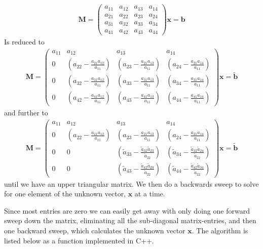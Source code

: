 \begin{align}
  \mathbf{M} = 
 \left( \begin{array}{rrrr}
 a_{11} & a_{12} & a_{13} & a_{14} \\
 a_{21} & a_{22} & a_{23} & a_{24} \\
 a_{31} & a_{32} & a_{33} & a_{34} \\
 a_{41} & a_{42} & a_{43} & a_{44}
 \end{array} \right)\mathbf{x} = \mathbf{b}
\end{align}
Is reduced to
\begin{align}
  \mathbf{M} = 
 \left( \begin{array}{rrrr}
 a_{11} & a_{12} & a_{13} & a_{14} \\
 0 & (a_{22}-\frac{a_{21}a_{12}}{a_{11}}) & (a_{23}-\frac{a_{21}a_{13}}{a_{11}}) & (a_{24}-\frac{a_{21}a_{14}}{a_{11}}) \\
 0 & (a_{32}-\frac{a_{31}a_{12}}{a_{11}}) & (a_{33}-\frac{a_{31}a_{13}}{a_{11}}) & (a_{34}-\frac{a_{31}a_{14}}{a_{11}}) \\
 0 & (a_{42}-\frac{a_{41}a_{12}}{a_{11}}) & (a_{43}-\frac{a_{41}a_{13}}{a_{11}}) & (a_{44}-\frac{a_{41}a_{14}}{a_{11}})
 \end{array} \right)\mathbf{x} = \tilde{\mathbf{b}}
\end{align}
and further to
\begin{align}
  \mathbf{M} = 
 \left( \begin{array}{rrrr}
 a_{11} & a_{12} & a_{13} & a_{14} \\
 0 & (a_{22}-\frac{a_{21}a_{12}}{a_{11}}) & (a_{23}-\frac{a_{21}a_{13}}{a_{11}}) & (a_{24}-\frac{a_{21}a_{14}}{a_{11}}) \\
 0 & 0 & (\tilde{a}_{33}-\frac{\tilde{a}_{32}\tilde{a}_{23}}{\tilde{a}_{22}}) & (\tilde{a}_{34}-\frac{\tilde{a}_{32}\tilde{a}_{24}}{\tilde{a}_{22}}) \\
 0 & 0 & (\tilde{a}_{43}-\frac{\tilde{a}_{42}\tilde{a}_{23}}{\tilde{a}_{22}}) & (\tilde{a}_{44}-\frac{\tilde{a}_{42}\tilde{a}_{34}}{\tilde{a}_{22}})
 \end{array} \right)\mathbf{x} = \tilde{\mathbf{b}}
\end{align}
until we have an upper triangular matrix. We then do a backwards sweep to solve for one element of the unknown vector, $\mathbf{x}$ at a time. 

Since most entries are zero we can easily get away with only doing one forward sweep down the matrix, eliminating all the sub-diagonal matrix-entries, and then one backward sweep, which calculates the unknown vector $\mathbf{x}$. The algorithm is listed below as a function implemented in C++.

